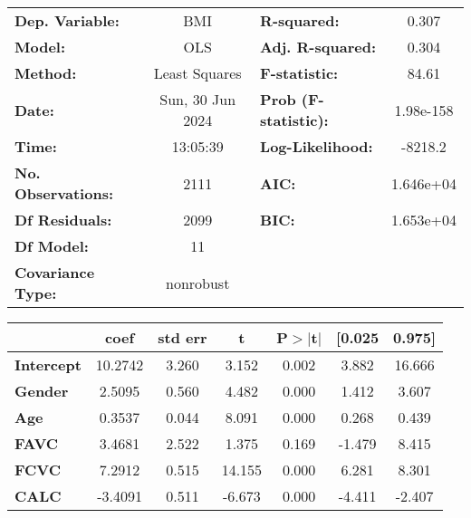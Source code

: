 \begin{center}
\begin{tabular}{lclc}
\toprule
\textbf{Dep. Variable:}    &       BMI        & \textbf{  R-squared:         } &     0.307   \\
\textbf{Model:}            &       OLS        & \textbf{  Adj. R-squared:    } &     0.304   \\
\textbf{Method:}           &  Least Squares   & \textbf{  F-statistic:       } &     84.61   \\
\textbf{Date:}             & Sun, 30 Jun 2024 & \textbf{  Prob (F-statistic):} & 1.98e-158   \\
\textbf{Time:}             &     13:05:39     & \textbf{  Log-Likelihood:    } &   -8218.2   \\
\textbf{No. Observations:} &        2111      & \textbf{  AIC:               } & 1.646e+04   \\
\textbf{Df Residuals:}     &        2099      & \textbf{  BIC:               } & 1.653e+04   \\
\textbf{Df Model:}         &          11      & \textbf{                     } &             \\
\textbf{Covariance Type:}  &    nonrobust     & \textbf{                     } &             \\
\bottomrule
\end{tabular}
\begin{tabular}{lcccccc}
                   & \textbf{coef} & \textbf{std err} & \textbf{t} & \textbf{P$> |$t$|$} & \textbf{[0.025} & \textbf{0.975]}  \\
\midrule
\textbf{Intercept} &      10.2742  &        3.260     &     3.152  &         0.002        &        3.882    &       16.666     \\
\textbf{Gender}    &       2.5095  &        0.560     &     4.482  &         0.000        &        1.412    &        3.607     \\
\textbf{Age}       &       0.3537  &        0.044     &     8.091  &         0.000        &        0.268    &        0.439     \\
\textbf{FAVC}      &       3.4681  &        2.522     &     1.375  &         0.169        &       -1.479    &        8.415     \\
\textbf{FCVC}      &       7.2912  &        0.515     &    14.155  &         0.000        &        6.281    &        8.301     \\
\textbf{CALC}      &      -3.4091  &        0.511     &    -6.673  &         0.000        &       -4.411    &       -2.407     \\

\end{tabular}
\end{center}
